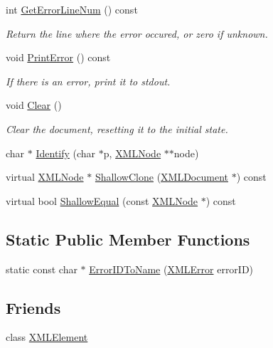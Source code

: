 \begin{DoxyCompactItemize}
int \hyperlink{classtinyxml2_1_1_x_m_l_document_ad82d07e43e096e834dbdfd06312398c1}{Get\+Error\+Line\+Num} () const
\begin{DoxyCompactList}\small\item\em Return the line where the error occured, or zero if unknown. \end{DoxyCompactList}\item 
void \hyperlink{classtinyxml2_1_1_x_m_l_document_a1d033945b42e125d933d6231e4571552}{Print\+Error} () const
\begin{DoxyCompactList}\small\item\em If there is an error, print it to stdout. \end{DoxyCompactList}\item 
void \hyperlink{classtinyxml2_1_1_x_m_l_document_a65656b0b2cbc822708eb351504178aaf}{Clear} ()
\begin{DoxyCompactList}\small\item\em Clear the document, resetting it to the initial state. \end{DoxyCompactList}\item 
char $\ast$ \hyperlink{classtinyxml2_1_1_x_m_l_document_a25827d1bec509ad566a107e5853ed040}{Identify} (char $\ast$p, \hyperlink{classtinyxml2_1_1_x_m_l_node}{X\+M\+L\+Node} $\ast$$\ast$node)
\item 
virtual \hyperlink{classtinyxml2_1_1_x_m_l_node}{X\+M\+L\+Node} $\ast$ \hyperlink{classtinyxml2_1_1_x_m_l_document_aa37cc1709d7e1e988bc17dcfb24a69b8}{Shallow\+Clone} (\hyperlink{classtinyxml2_1_1_x_m_l_document}{X\+M\+L\+Document} $\ast$) const
\item 
virtual bool \hyperlink{classtinyxml2_1_1_x_m_l_document_a6fe5ef18699091844fcf64b56ffa5bf9}{Shallow\+Equal} (const \hyperlink{classtinyxml2_1_1_x_m_l_node}{X\+M\+L\+Node} $\ast$) const
\end{DoxyCompactItemize}
\subsection*{Static Public Member Functions}
\begin{DoxyCompactItemize}
\item 
static const char $\ast$ \hyperlink{classtinyxml2_1_1_x_m_l_document_a639f7c295c38dc5a4aafeb2fff93da03}{Error\+I\+D\+To\+Name} (\hyperlink{namespacetinyxml2_a1fbf88509c3ac88c09117b1947414e08}{X\+M\+L\+Error} error\+ID)
\end{DoxyCompactItemize}
\subsection*{Friends}
\begin{DoxyCompactItemize}
\item 
class \hyperlink{classtinyxml2_1_1_x_m_l_document_ac2fba9b6e452829dd892f7392c24e0eb}{X\+M\+L\+Element}
\end{DoxyCompactItemize}
